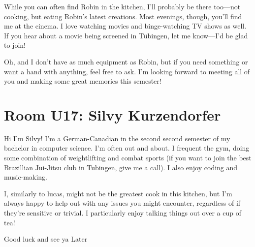 While you can often find Robin in the kitchen, I’ll probably be there too—not cooking, but eating Robin’s latest creations. Most evenings, though, you’ll find me at the cinema. I love watching movies and binge-watching TV shows as well. If you hear about a movie being screened in Tübingen, let me know—I’d be glad to join!  

Oh, and I don’t have as much equipment as Robin, but if you need something or want a hand with anything, feel free to ask. I’m looking forward to meeting all of you and making some great memories this semester!

\section{Room U17: Silvy Kurzendorfer} \label{sec:SilvyK}
%
\FPsub\result{\theCurrentDate}{\theBirthdate}
\FPdiv{}
\FPtrunc{}

Hi I'm Silvy! I'm a German-Canadian in the second second semester of my bachelor in computer science. I'm often out and about. I frequent the gym, doing some combination of weightlifting and combat sports (if you want to join the best Brazillian Jui-Jitsu club in Tubingen, give me a call). I also enjoy coding and music-making. 

I, similarly to lucas, might not be the greatest cook in this kitchen, but I'm always happy to help out with any issues you might encounter, regardless of if they're sensitive or trivial. I particularly enjoy talking things out over a cup of tea!

Good luck and see ya Later
